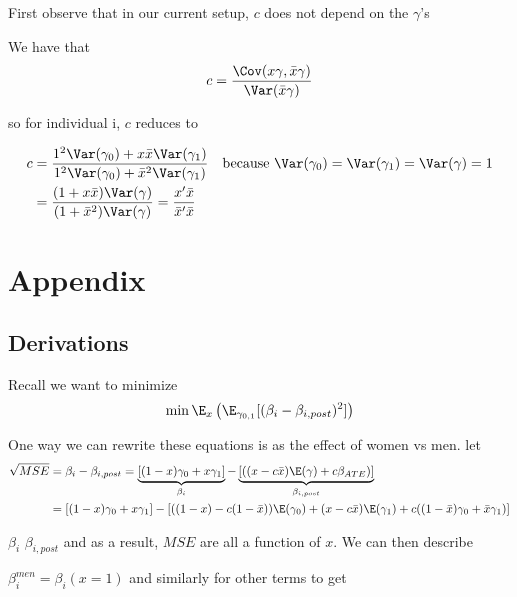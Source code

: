 First observe that in our current setup, $c$ does not depend on the $\gamma$'s

We have that
\begin{align*}
	c = \frac{\Cov (x \gamma, \bar{x} \gamma)}{ \Var( \bar{x} \gamma )}
\end{align*} 

so for individual i, $c$ reduces to


\begin{align*}
	c &= \frac{1^2\Var(\gamma_0) + x \bar{x} \Var(\gamma_1)}{1^2\Var(\gamma_0) + \bar{x}^2\Var(\gamma_1)} \quad \text{because $\Var(\gamma_0) = \Var(\gamma_1) = \Var(\gamma) = 1$} \\
	&= \frac{(1 + x \bar{x})\Var(\gamma)}{(1 + \bar{x}^2)\Var(\gamma)} = \frac{x' \bar{x}}{\bar{x}' \bar{x}}
\end{align*} 




\section{Appendix}

\subsection*{Derivations}

Recall we want to minimize
\begin{align*}
\min \E_x \left(\E_{\gamma_{0,1}}[(\beta_i - \beta_{i,post})^2]\right)
\end{align*}

One way we can rewrite these equations is as the effect of women vs men.
let
\begin{align*}
	\sqrt{MSE} &= \beta_i -  \beta_{i,post} = \underbrace{[(1-x) \gamma_0 + x \gamma_1]}_{\text{$\beta_i$}}  - \underbrace{[((x - c \bar{x})\E(\gamma) + c \beta_{ATE})]}_\text{$\beta_{i,post}$} \\
	  &= [(1-x) \gamma_0 + x \gamma_1]  - [((1-x) - c (1 - \bar{x})) \E(\gamma_0) + (x - c \bar{x})\E(\gamma_1) + c((1-\bar{x}) \gamma_0 + \bar{x} \gamma_1)] \\
\end{align*}

$\beta_i$ $\beta_{i, post}$ and as a result, $MSE$ are all a function of $x$. We can then describe

$\beta_{i}^{men} = \beta_i (x=1)$ and similarly for other terms to get

